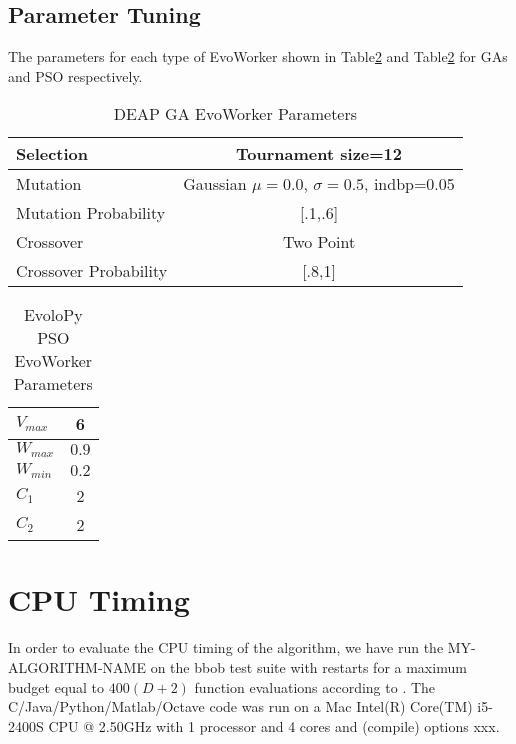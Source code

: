 \documentclass[sigconf]{acmart}
\newcommand{\change}[1]{{\color{red} #1}}
\begin{document}
\subsection{Parameter Tuning}
The parameters for each type of EvoWorker shown in Table\ref{tab:GAparams}
and Table\ref{tab:GAparams} for GAs and PSO respectively.
\begin{table}
  \small
  \caption{ DEAP GA EvoWorker Parameters }
  \label{tab:GAparams} 
  \centering
  \small
  \begin{tabular}{|l|c|}
    \hline
    Selection & Tournament size=12\\ \hline
    Mutation & Gaussian $\mu=0.0$, $\sigma=0.5$, indbp=0.05  \\ \hline
    Mutation Probability & [.1,.6]  \\ \hline
    Crossover & Two Point  \\ \hline
    Crossover Probability& [.8,1]  \\ \hline
  \end{tabular}
\end{table}

\begin{table}
  \small
  \caption{ EvoloPy PSO EvoWorker Parameters }
  \label{tab:GAparams} 
  \centering
  \small
  \begin{tabular}{|l|c|}
    \hline
    $V_{max}$ & 6 \\ \hline
    $W_{max}$ & $0.9$ \\ \hline
    $W_{min}$ & $0.2$ \\ \hline
    $C_1$ & 2 \\ \hline
    $C_2$ & 2 \\ \hline
  \end{tabular}
\end{table}


%
\section{CPU Timing}
In order to evaluate the CPU timing of the algorithm, we have run the \change{MY-ALGORITHM-NAME} 
on the  \change{bbob test suite \cite{hansen2009fun}} with restarts for a maximum budget 
equal to \change{$400 (D + 2)$} function evaluations according to \cite{hansen2016exp}. 
The \change{C/Java/Python/Matlab/Octave} code was run on a \change{Mac Intel(R) Core(TM) 
i5-2400S CPU @ 2.50GHz} with \change{1} processor and \change{4} cores \change{and (compile) options xxx}. 
\end{document}
